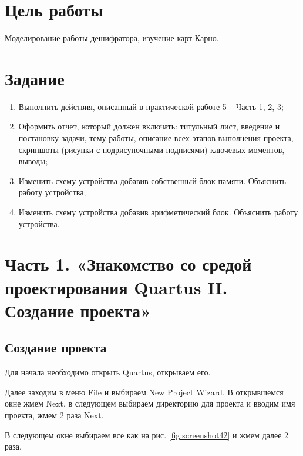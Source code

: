 \documentclass[a4paper,14pt]{article}
\begin{document}

\tableofcontents
\pagebreak

\section{Цель работы}

Моделирование работы дешифратора, изучение карт Карно.

\section{Задание}

\begin{enumerate}
\item Выполнить действия, описанный в практической работе 5 -- Часть 1, 2, 3;

\item Оформить отчет, который должен включать: титульный лист, введение и постановку задачи, тему работы, описание всех этапов выполнения проекта, скриншоты (рисунки с подрисуночными подписями) ключевых моментов, выводы;

\item Изменить схему устройства добавив собственный блок памяти.
Объяснить работу устройства;

\item Изменить схему устройства добавив арифметический блок.
Объяснить работу устройства.

\end{enumerate}

\section{Часть 1. «Знакомство со средой проектирования Quartus II. Создание проекта»}

\subsection{Создание проекта}

Для начала необходимо открыть Quartus, открываем его.

Далее заходим в меню File и выбираем New Project Wizard.
В открывшемся окне жмем Next, в следующем выбираем директорию для проекта и вводим имя проекта, жмем 2 раза Next.

В следующем окне выбираем все как на рис. \ref{fig:screenshot42} и жмем далее 2 раза.
\end{document}
